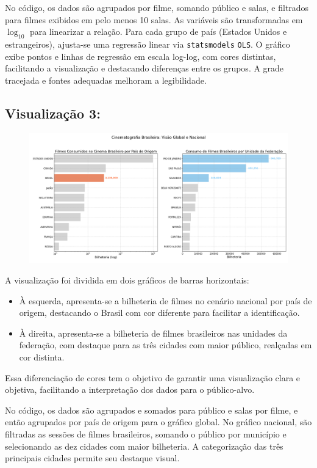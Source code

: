 \documentclass{article}
\begin{document}
No código, os dados são agrupados por filme, somando público e salas, e filtrados para filmes exibidos em pelo menos 10 salas. As variáveis são transformadas em \(\log_{10}\) para linearizar a relação. Para cada grupo de país (Estados Unidos e estrangeiros), ajusta-se uma regressão linear via \texttt{statsmodels} \texttt{OLS}. O gráfico exibe pontos e linhas de regressão em escala log-log, com cores distintas, facilitando a visualização e destacando diferenças entre os grupos. A grade tracejada e fontes adequadas melhoram a legibilidade.

\subsection*{Visualização 3:}
\begin{figure}[H]
    \centerline{\includegraphics[width = \linewidth]{img/Figure_3.png}}
\end{figure}
A visualização foi dividida em dois gráficos de barras horizontais:

\begin{itemize}
    \item À esquerda, apresenta-se a bilheteria de filmes no cenário nacional por país de origem, destacando o Brasil com cor diferente para facilitar a identificação.
    \item À direita, apresenta-se a bilheteria de filmes brasileiros nas unidades da federação, com destaque para as três cidades com maior público, realçadas em cor distinta.
\end{itemize}

Essa diferenciação de cores tem o objetivo de garantir uma visualização clara e objetiva, facilitando a interpretação dos dados para o público-alvo.

\vspace{0.3cm}

No código, os dados são agrupados e somados para público e salas por filme, e então agrupados por país de origem para o gráfico global. No gráfico nacional, são filtradas as sessões de filmes brasileiros, somando o público por município e selecionando as dez cidades com maior bilheteria. A categorização das três principais cidades permite seu destaque visual.
\end{document}
